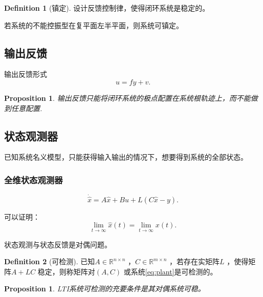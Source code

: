 \documentclass[14pt,a4paper]{article}
\theoremstyle{plain}
\theoremstyle{definition}
\newtheorem*{dfn}{Definition}
\theoremstyle{remark}
\theoremstyle{plain}
\theoremstyle{plain}
\theoremstyle{plain}
\newtheorem{prop}[thm]{Proposition}
\theoremstyle{definition}
\theoremstyle{remark}
\numberwithin{equation}{section}
\begin{document}
				\begin{dfn}[镇定]  
				\label{dfn:镇定}
					设计反馈控制律，使得闭环系统是稳定的。
				\end{dfn} 

				若系统的不能控振型在复平面左半平面，则系统可镇定。

		\subsection{输出反馈}%
		\label{sub:输出反馈} 

			输出反馈形式
			\begin{equation}
			\label{eq:outputfeedback}
				u = fy+v
			.\end{equation} 

			\begin{prop}  
			\label{prop:输出反馈根轨迹}
				输出反馈只能将闭环系统的极点配置在系统根轨迹上，而不能做到任意配置.
			\end{prop} 


		\subsection{状态观测器}%
		\label{sub:状态观测器}

			已知系统名义模型，只能获得输入输出的情况下，想要得到系统的全部状态。
	
			\subsubsection{全维状态观测器}%
			\label{ssub:全维状态观测器}
			
				\begin{equation}
				\label{eq:alldimensionalstateobserver}
					\dot{\hat{x}} = A\hat{x} + Bu + L\left( C\hat{x} - y \right) 
				.\end{equation} 

				可以证明：
				\[
					\lim_{t\to \infty} \hat{x}(t) = \lim_{t\to \infty} x(t) 
				.\] 

				状态观测与状态反馈是对偶问题。

				\begin{dfn}[可检测]  
				\label{dfn:可检测}
				已知$A\in \mathbb{R}^{n\times n}$ ，$C\in \mathbb{R}^{m\times n}$ ，若存在实矩阵$L$ ，使得矩阵$A+LC$ 稳定，则称矩阵对$\left( A,C \right) $ 或系统\eqref{eq:plant}是可检测的。
				\end{dfn} 

				\begin{prop}  
				\label{prop:可检测性与可稳性的关系}
					LTI系统可检测的充要条件是其对偶系统可稳。
				\end{prop} 
\end{document}
